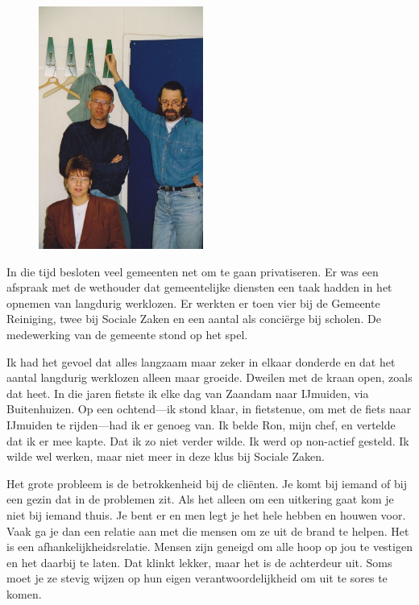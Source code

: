 \documentclass[12pt,twoside, openright]{memoir}
\begin{document}
\begin{figure}
\begin{center}
\includegraphics[width=0.48\textwidth]{img/ch46/velsen_0002}
\end{center}
\end{figure}

In die tijd besloten veel gemeenten net om te gaan privatiseren. Er was een afspraak met de wethouder dat gemeentelijke diensten een taak hadden in het opnemen van langdurig werklozen. Er werkten er toen vier bij de Gemeente Reiniging, twee bij Sociale Zaken en een aantal als conciërge bij scholen. De medewerking van de gemeente stond op het spel. 

Ik had het gevoel dat alles langzaam maar zeker in elkaar donderde en dat het aantal langdurig werklozen alleen maar groeide. Dweilen met de kraan open, zoals dat heet. In die jaren fietste ik elke dag van Zaandam naar IJmuiden, via Buitenhuizen. Op een ochtend---ik stond klaar, in fietstenue, om met de fiets naar IJmuiden te rijden---had ik er genoeg van. Ik belde Ron, mijn chef, en vertelde dat ik er mee kapte. Dat ik zo niet verder wilde. Ik werd op non-actief gesteld. Ik wilde wel werken, maar niet meer in deze klus bij Sociale Zaken.

Het grote probleem is de betrokkenheid bij de cliënten. Je komt bij iemand of bij een gezin dat in de problemen zit. Als het alleen om een uitkering gaat kom je niet bij iemand thuis. Je bent er en men legt je het hele hebben en houwen voor. Vaak ga je dan een relatie aan met die mensen om ze uit de brand te helpen. Het is een afhankelijkheidsrelatie. Mensen zijn geneigd om alle hoop op jou te vestigen en het daarbij te laten. Dat klinkt lekker, maar het is de achterdeur uit. Soms moet je ze stevig wijzen op hun eigen verantwoordelijkheid om uit te sores te komen. 
\end{document}
